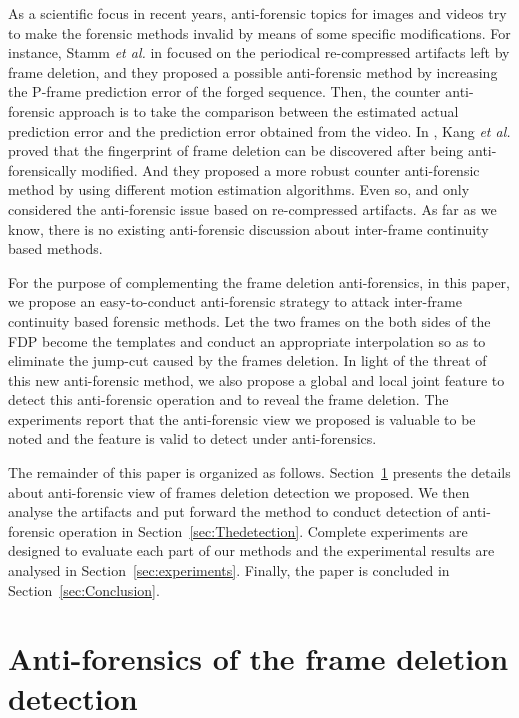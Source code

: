 \documentclass[pdftex,twocolumn,epjc3]{svjour3}          %
\begin{document}
As a scientific focus in recent years, anti-forensic topics for images and videos \cite{A13,A14,A15,A16} try to make the forensic methods invalid by means of some specific modifications. For instance, Stamm \emph{et al.} in \cite{A15} focused on the periodical re-compressed artifacts left by frame deletion, and they proposed a possible anti-forensic method by increasing the P-frame prediction error of the forged sequence. Then, the counter anti-forensic approach is to take the comparison between the estimated actual prediction error and the prediction error obtained from the video. In \cite{A16}, Kang \emph{et al.} proved that the fingerprint of frame deletion can be discovered after being anti-forensically modified. And they proposed a more robust counter anti-forensic method by using different motion estimation algorithms. Even so, \cite{A15} and \cite{A16} only considered the anti-forensic issue based on re-compressed artifacts. As far as we know, there is no existing anti-forensic discussion about inter-frame continuity based methods.

For the purpose of complementing the frame deletion anti-forensics, in this paper, we propose an easy-to-conduct anti-forensic strategy to attack inter-frame continuity based forensic methods. Let the two frames on the both sides of the FDP become the templates and conduct an appropriate interpolation so as to eliminate the jump-cut caused by the frames deletion. In light of the threat of this new anti-forensic method, we also propose a global and local joint feature to detect this anti-forensic operation and to reveal the frame deletion. The experiments report that the anti-forensic view we proposed is valuable to be noted and the feature is valid to detect under anti-forensics.

The remainder of this paper is organized as follows. Section~\ref{sec:Anti} presents the details about anti-forensic view of frames deletion detection we proposed. We then analyse the artifacts and put forward the method to conduct detection of anti-forensic operation in Section~\ref{sec:Thedetection}. Complete experiments are designed to evaluate each part of our methods and the experimental results are analysed in Section~\ref{sec:experiments}. Finally, the paper is concluded in Section~\ref{sec:Conclusion}.

\section{Anti-forensics of the frame deletion detection}
\label{sec:Anti}
\end{document}
